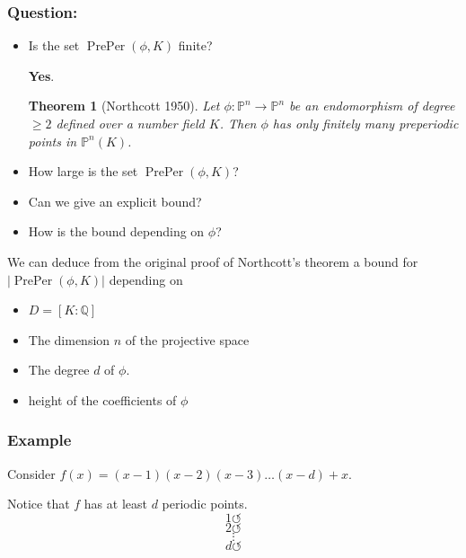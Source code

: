 \documentclass{beamer}
\def\PP{{\mathbb P}}
\def\QQ{{\mathbb Q}}
\DeclareMathOperator{\PrePer}{PrePer}
\theoremstyle{thmstyle}
\newtheorem*{mythm}{Theorem}
\theoremstyle{mystyle}
\theoremstyle{qstnstyle}
\begin{document}
\begin{frame}
\frametitle{Question:}
\begin{itemize}
\item Is the set $\PrePer(\phi,K)$ finite? 

\pause \textbf{Yes}. 
\vspace{6mm}\pause

\begin{mythm}[Northcott 1950]
Let $\phi : \PP^n \to \PP^n$ be an endomorphism of degree $\geq{2}$
defined over a number field $K$. Then $\phi$ has
only finitely many preperiodic points in $\PP^n(K)$.
\end{mythm}


\pause \vspace{3mm}
\end{itemize}
\begin{itemize}
\item How large is the set $\PrePer(\phi,K)$? 
\item Can we give an explicit bound?
\item How is the bound depending on $\phi$? 

\end{itemize}

\end{frame}


\begin{frame}
We can deduce from the original proof of Northcott's theorem  a bound for $|\PrePer(\phi,K)|$ depending on
\begin{itemize}
\item  $D=[K: \QQ]$ 

\item The dimension $n$ of the projective space  

\item The degree $d$ of $\phi$.

\item height of the coefficients of $\phi$
\end{itemize}

\end{frame}

\begin{frame}
\frametitle{Example}
Consider $f(x)=(x-1)(x-2)(x-3)\ldots(x-d)+x$.
\pause

Notice that $f$ has at least $d$ periodic points. 
$$1 \circlearrowleft  $$
$$2 \circlearrowleft  $$
$$\vdots  $$
$$d \circlearrowleft  $$

\pause

\end{frame}
\end{document}
